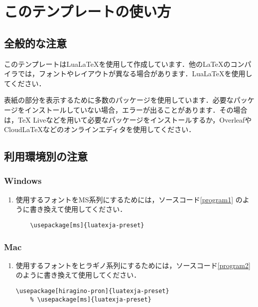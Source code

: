 \documentclass[a4paper]{ltjsarticle}
\begin{document}
\section{このテンプレートの使い方}
\subsection{全般的な注意}
このテンプレートはLuaLaTeXを使用して作成しています．他の\LaTeX のコンパイラでは，フォントやレイアウトが異なる場合があります．LuaLaTeXを使用してください．

表紙の部分を表示するために多数のパッケージを使用しています．必要なパッケージをインストールしていない場合，エラーが出ることがあります．その場合は，TeX Liveなどを用いて必要なパッケージをインストールするか，OverleafやCloudLaTeXなどのオンラインエディタを使用してください．

\subsection{利用環境別の注意}
\subsubsection{Windows}
\begin{enumerate}
  \item 使用するフォントをMS系列にするためには，ソースコード\ref{program1} のように書き換えて使用してください．
  \begin{lstlisting}[caption = 書き換え例 , label = program1]
    % \usepackage[hiragino-pron]{luatexja-preset}
    \usepackage[ms]{luatexja-preset}
  \end{lstlisting}
\end{enumerate}

\subsubsection{Mac}
\begin{enumerate}
  \item 使用するフォントをヒラギノ系列にするためには，ソースコード\ref{program2} のように書き換えて使用してください．
  \begin{lstlisting}[caption = 書き換え例 , label = program2]
    \usepackage[hiragino-pron]{luatexja-preset}
    % \usepackage[ms]{luatexja-preset}
  \end{lstlisting}
\end{enumerate}
\end{document}
